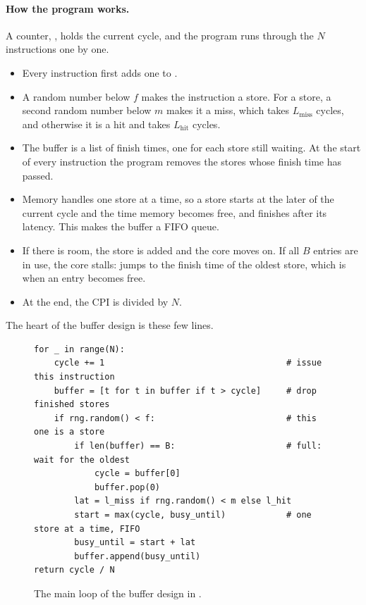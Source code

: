 \paragraph{How the program works.} A counter, , holds the current cycle, and the program runs through the $N$ instructions one by one.
\begin{itemize}
\item Every instruction first adds one to .
\item A random number below $f$ makes the instruction a store. For a store, a second random number below $m$ makes it a miss, which takes $L_{\text{miss}}$ cycles, and otherwise it is a hit and takes $L_{\text{hit}}$ cycles.
\item The buffer is a list of finish times, one for each store still waiting. At the start of every instruction the program removes the stores whose finish time has passed.
\item Memory handles one store at a time, so a store starts at the later of the current cycle and the time memory becomes free, and finishes after its latency. This makes the buffer a FIFO queue.
\item If there is room, the store is added and the core moves on. If all $B$ entries are in use, the core stalls:  jumps to the finish time of the oldest store, which is when an entry becomes free.
\item At the end, the CPI is  divided by $N$.
\end{itemize}

The heart of the buffer design is these few lines.

\begin{figure}[!htbp]
\centering
\begin{lstlisting}[style=vspython]
for _ in range(N):
    cycle += 1                                    # issue this instruction
    buffer = [t for t in buffer if t > cycle]     # drop finished stores
    if rng.random() < f:                          # this one is a store
        if len(buffer) == B:                      # full: wait for the oldest
            cycle = buffer[0]
            buffer.pop(0)
        lat = l_miss if rng.random() < m else l_hit
        start = max(cycle, busy_until)            # one store at a time, FIFO
        busy_until = start + lat
        buffer.append(busy_until)
return cycle / N
\end{lstlisting}
\caption{The main loop of the buffer design in .}
\label{fig:cpiloop}
\end{figure}

